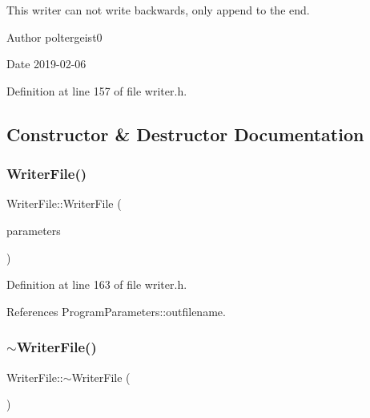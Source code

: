 This writer can not write backwards, only append to the end.

\begin{DoxyAuthor}{Author}
poltergeist0
\end{DoxyAuthor}
\begin{DoxyDate}{Date}
2019-\/02-\/06 
\end{DoxyDate}


Definition at line 157 of file writer.\+h.



\subsection{Constructor \& Destructor Documentation}
\mbox{\label{classWriterFile_a71ecabe84c75047ce63e2d1fc5b86e41}} 
\subsubsection{\texorpdfstring{Writer\+File()}{WriterFile()}}
{\footnotesize\ttfamily Writer\+File\+::\+Writer\+File (\begin{DoxyParamCaption}\item[{const \hyperlink{structProgramParameters}{Program\+Parameters} \&}]{parameters }\end{DoxyParamCaption})\hspace{0.3cm}{\ttfamily [inline]}}



Definition at line 163 of file writer.\+h.



References Program\+Parameters\+::outfilename.

\mbox{\label{classWriterFile_afcb8503eb87652be875d6e98ee7498d7}} 
\subsubsection{\texorpdfstring{$\sim$\+Writer\+File()}{~WriterFile()}}
{\footnotesize\ttfamily Writer\+File\+::$\sim$\+Writer\+File (\begin{DoxyParamCaption}{ }\end{DoxyParamCaption})\hspace{0.3cm}{\ttfamily [inline]}}




